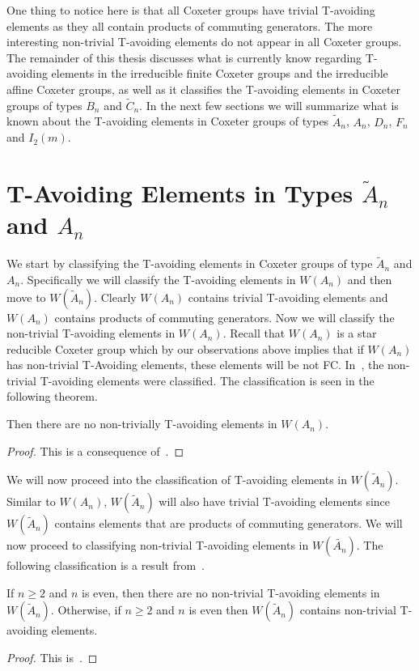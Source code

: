 One thing to notice here is that all Coxeter groups have trivial T-avoiding elements as they all contain products of commuting generators. The more interesting non-trivial T-avoiding elements do not appear in all Coxeter groups. The remainder of this thesis discusses what is currently know regarding T-avoiding elements in the irreducible finite Coxeter groups and the irreducible affine Coxeter groups, as well as it classifies the T-avoiding elements in Coxeter groups of types $B_n$ and $\widetilde{C}_n$. In the next few sections we will summarize what is known about the T-avoiding elements in Coxeter groups of types $\widetilde{A}_n$, $A_n$, $D_n$, $F_n$ and $I_2(m)$.



\section{T-Avoiding Elements in Types $\widetilde{A}_n$ and $A_n$}
We start by classifying the T-avoiding elements in Coxeter groups of type $\widetilde{A}_n$ and $A_n$. Specifically we will classify the T-avoiding elements in $W(A_n)$ and then move to $W(\widetilde{A}_n)$. Clearly $W(A_n)$ contains trivial T-avoiding elements and $W(A_n)$ contains products of commuting generators. Now we will classify the non-trivial T-avoiding elements in $W(A_n)$. Recall that $W(A_n)$ is a star reducible Coxeter group which by our observations above implies that if $W(A_n)$ has non-trivial T-Avoiding elements, these elements will be not FC. In~\cite{Fan1999}, the non-trivial T-avoiding elements were classified. The classification is seen in the following theorem.

\begin{theorem}
Then there are no non-trivially T-avoiding elements in $W(A_n)$. 
\begin{proof}
This is a consequence of~\cite[Proposition 3.1.2.]{Fan1999}.	 
\end{proof}
\end{theorem}

We will now proceed into the classification of T-avoiding elements in $W(\widetilde{A}_n)$. Similar to $W(A_n)$, $W(\widetilde{A}_n)$ will also have trivial T-avoiding elements since $W(\widetilde{A}_n)$ contains elements that are products of commuting generators. We will now proceed to classifying non-trivial T-avoiding elements in $W(\widetilde{A_n})$. The following classification is a result from~\cite{Fan1999}.

\begin{theorem}
 If $n \geq 2$ and $n$ is even, then there are no non-trivial T-avoiding elements in $W(\widetilde{A}_n)$. Otherwise, if $n \geq 2$ and $n$ is even then $W(\widetilde{A}_n)$ contains non-trivial T-avoiding elements.
\begin{proof}
	This is~\cite[Proposition~3.1.2.]{Fan1999}.
\end{proof}
\end{theorem}

